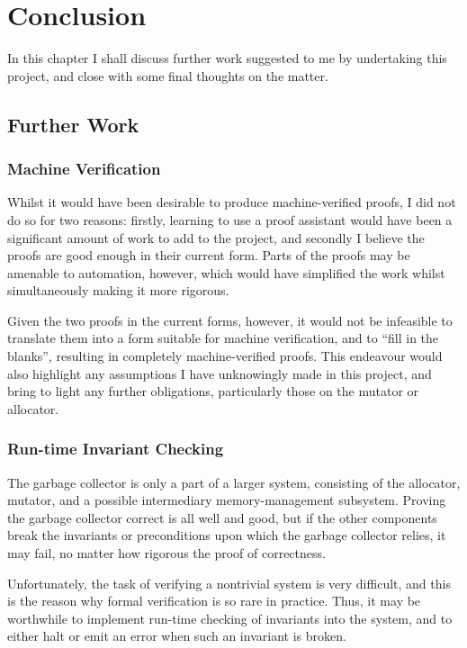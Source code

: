 \chapter{Conclusion}
\label{sec:conclusion}

In this chapter I shall discuss further work suggested to me by
undertaking this project, and close with some final thoughts on the
matter.

\section{Further Work}
\label{sec:conclusion-further}

\subsection{Machine Verification}
\label{sec:conclusion-further-machineverification}

Whilst it would have been desirable to produce machine-verified
proofs, I did not do so for two reasons: firstly, learning to use a
proof assistant would have been a significant amount of work to add to
the project, and secondly I believe the proofs are good enough in
their current form. Parts of the proofs may be amenable to automation,
however, which would have simplified the work whilst simultaneously
making it more rigorous.

Given the two proofs in the current forms, however, it would not be
infeasible to translate them into a form suitable for machine
verification, and to ``fill in the blanks'', resulting in completely
machine-verified proofs. This endeavour would also highlight any
assumptions I have unknowingly made in this project, and bring to
light any further obligations, particularly those on the mutator or
allocator.

\subsection{Run-time Invariant Checking}
\label{sec:conclusion-further-invariants}

The garbage collector is only a part of a larger system, consisting of
the allocator, mutator, and a possible intermediary memory-management
subsystem. Proving the garbage collector correct is all well and good,
but if the other components break the invariants or preconditions upon
which the garbage collector relies, it may fail, no matter how
rigorous the proof of correctness.

Unfortunately, the task of verifying a nontrivial system is very
difficult, and this is the reason why formal verification is so rare
in practice. Thus, it may be worthwhile to implement run-time checking
of invariants into the system, and to either halt or emit an error
when such an invariant is broken.

